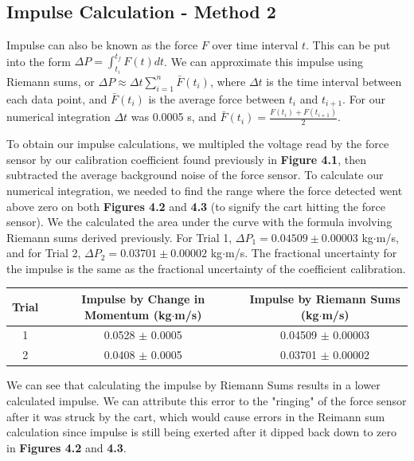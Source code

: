 \documentclass[11pt]{report}
\begin{document}
\subsection*{Impulse Calculation - Method 2}
Impulse can also be known as the force \(F\) over time interval \(t\).  This can
be put into the form \(\Delta P = \int_{t_i}^{t_f} F(t)dt\).  We can approximate
this impulse using Riemann sums, or \(\Delta P \approx \Delta t
\sum_{i=1}^{n}\bar{F}(t_i)\), where $\Delta t$ is the time interval between each
data point, and \(\bar{F}(t_i)\) is the average force between $t_i$ and
$t_{i+1}$.  For our numerical integration $\Delta t$ was 0.0005 s, and \(\bar{F}(t_i) =
\frac{F(t_i) + F(t_{i+1})}{2}\).

\setlength{\parindent}{5ex}
To obtain our impulse calculations, we multipled the voltage read by the force
sensor by our calibration coefficient found previously in \textbf{Figure 4.1},
then subtracted the average background noise of the force sensor.  To calculate
our numerical integration, we needed to find the range where the force detected 
went above zero on both \textbf{Figures 4.2} and \textbf{4.3} (to signify the cart hitting the
force sensor). We the calculated the area under the curve with the formula involving
Riemann sums derived previously.  For Trial 1, \(\Delta P_1 = 0.04509 \pm
0.00003\) kg$\cdot$m/s, and for Trial 2, \(\Delta P_2 = 0.03701 \pm 0.00002\) kg$\cdot$m/s.  
The fractional uncertainty for the impulse is the same as the fractional 
uncertainty of the coefficient calibration.

\begin{center}
    \begin{tabular}{| c | c | c |}
        \hline
        Trial & Impulse by Change in Momentum (kg$\cdot$m/s) & Impulse
        by Riemann Sums (kg$\cdot$m/s) \\
        \hline
        1 & 0.0528 $\pm$ 0.0005 & 0.04509 $\pm$ 0.00003 \\
        \hline
        2 & 0.0408 $\pm$ 0.0005 & 0.03701 $\pm$ 0.00002 \\
        \hline
    \end{tabular}
\end{center}

We can see that calculating the impulse by Riemann Sums results in a lower
calculated impulse. We can attribute this error to the "ringing" of the force
sensor after it was struck by the cart, which would cause errors in the Reimann
sum calculation since impulse is still being exerted after it dipped back down
to zero in \textbf{Figures 4.2} and \textbf{4.3}.
\end{document}
